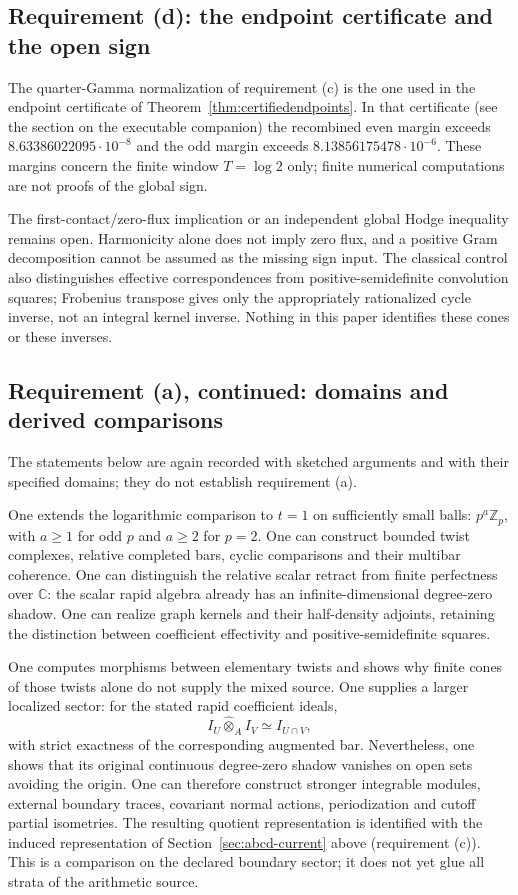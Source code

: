 \documentclass[11pt]{amsart}
\theoremstyle{definition}
\theoremstyle{remark}
\begin{document}
\subsection{Requirement (d): the endpoint certificate and the open sign}
The quarter-Gamma normalization of requirement (c) is the one used in the
endpoint certificate of Theorem~\ref{thm:certifiedendpoints}. In that
certificate (see the section on the executable companion) the recombined
even margin exceeds $8.63386022095\cdot10^{-8}$ and the odd margin exceeds
$8.13856175478\cdot10^{-6}$. These margins concern the finite window
$T=\log2$ only; finite numerical computations are not proofs of the
global sign.

The first-contact/zero-flux implication or an independent global Hodge
inequality remains open. Harmonicity alone does not imply zero flux,
and a positive Gram decomposition cannot be assumed as the missing sign
input. The classical control also distinguishes effective correspondences
from positive-semidefinite convolution squares; Frobenius transpose gives
only the appropriately rationalized cycle inverse, not an integral kernel
inverse. Nothing in this paper identifies these cones or these inverses.

\subsection{Requirement (a), continued: domains and derived comparisons}
\label{sec:a-sketches}
The statements below are again recorded with sketched arguments and with
their specified domains; they do not establish requirement (a).

One extends the logarithmic comparison to $t=1$ on sufficiently
small balls: $p^a\mathbb Z_p$, with $a\geq1$ for odd $p$ and $a\geq2$
for $p=2$. One can construct bounded twist complexes, relative
completed bars, cyclic comparisons and their multibar coherence.
One can distinguish the relative scalar retract from finite
perfectness over $\mathbb C$: the scalar rapid algebra already has an
infinite-dimensional degree-zero shadow. One can realize graph
kernels and their half-density adjoints, retaining the distinction
between coefficient effectivity and positive-semidefinite squares.

One computes morphisms between elementary twists and shows why
finite cones of those twists alone do not supply the mixed source.
One supplies a larger localized sector: for the stated rapid
coefficient ideals,
\[
 I_U\widehat\otimes_A I_V\simeq I_{U\cap V},
\]
with strict exactness of the corresponding augmented bar. Nevertheless,
one shows that its original continuous degree-zero shadow vanishes
on open sets avoiding the origin. One can therefore construct
stronger integrable modules, external boundary traces, covariant normal
actions, periodization and cutoff partial isometries. The resulting
quotient representation is identified with the induced representation
of Section~\ref{sec:abcd-current} above (requirement (c)). This is a comparison on the declared boundary sector;
it does not yet glue all strata of the arithmetic source.
\end{document}
